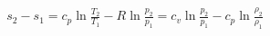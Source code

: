 \documentclass[10pt]{article}
\begin{document}
\begin{align*}s_{2}-s_{1} 
= c_{p} \ln \frac{T_{2}}{T_{1}} - R \ln \frac{p_{2}}{p_{1}}
= c_{v} \ln \frac{p_{2}}{p_{1}} - c_{p} \ln \frac{\rho_{2}}{\rho_{1}}\end{align*}
\end{document}
